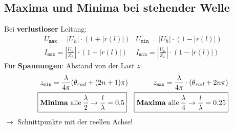 \subsection{Maxima und Minima bei stehender Welle}
Bei \textbf{verlustloser} Leitung:
\begin{align*}
	&U_{\texttt{max}} = |U_h| \cdot (1+|r(l)|) & U_{\texttt{min}} = |U_h| \cdot (1-|r(l)|) &\\
	&I_{\texttt{max}} = \left | \frac{U_h}{Z_L} \right | \cdot (1+|r(l)|) & I_{\texttt{min}} = \left| \frac{U_h}{Z_L} \right | \cdot (1-|r(l)|) &
\end{align*}
Für \textbf{Spannungen}: Abstand von der Last $ z $ 
\begin{align*}
	 &z_{\texttt{min}} = \frac{\lambda}{4\pi}(\theta_{rad}+(2n+1)\pi)&
	 z_{\texttt{max}} = \frac{\lambda}{4\pi} \cdot (\theta_{rad}+2n\pi)&\\
	 \Aboxed{&\text{\textbf{Minima} alle}\: \frac{\lambda}{2} \rightarrow \frac{l}{\lambda}=0.5} \Aboxed{&
	 	\text{\textbf{Maxima} alle}\: \frac{\lambda}{4} \rightarrow \frac{l}{\lambda}=0.25} &
\end{align*}
$ \rightarrow $ Schnittpunkte mit der reellen Achse!
